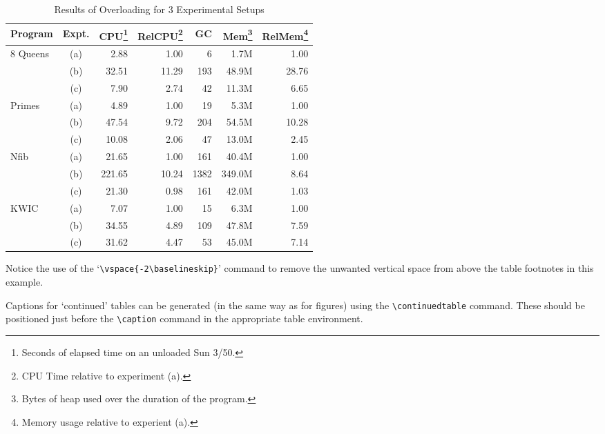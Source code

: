 \documentclass{jfp1}
\begin{document}
%
\begin{table}
  \caption{Results of Overloading for 3 Experimental Setups}
  \label{sample-table}
  \begin{minipage}{\textwidth}
    \begin{tabular}{lcrrrrr}
      \hline\hline
      Program& Expt.&
      CPU\footnote{Seconds of elapsed time on an unloaded Sun 3/50.}&
      RelCPU\footnote{CPU Time relative to experiment (a).}& GC&
      Mem\footnote{Bytes of heap used over the duration of the program.}&
      RelMem\footnote{Memory usage relative to experient (a).}\\
      \hline
      8 Queens& (a)&   2.88&  1.00&    6&   1.7M&  1.00\\
      &         (b)&  32.51& 11.29&  193&  48.9M& 28.76\\
      &         (c)&   7.90&  2.74&   42&  11.3M&  6.65\\
      \noalign{\vspace {.5cm}}
      Primes&   (a)&   4.89&  1.00&   19&   5.3M&  1.00\\
      &         (b)&  47.54&  9.72&  204&  54.5M& 10.28\\
      &         (c)&  10.08&  2.06&   47&  13.0M&  2.45\\
      \noalign{\vspace {.5cm}}
      Nfib&     (a)&  21.65&  1.00&  161&  40.4M&  1.00\\
      &         (b)& 221.65& 10.24& 1382& 349.0M&  8.64\\
      &         (c)&  21.30&  0.98&  161&  42.0M&  1.03\\
      \noalign{\vspace {.5cm}}
      KWIC&     (a)&   7.07&  1.00&   15&   6.3M&  1.00\\
      &         (b)&  34.55&  4.89&  109&  47.8M&  7.59\\
      &         (c)&  31.62&  4.47&   53&  45.0M&  7.14\\
      \hline\hline
    \end{tabular}
    \vspace{-2\baselineskip}
  \end{minipage}
\end{table}

Notice the use of the `\verb"\vspace{-2\baselineskip}"' command to remove the
unwanted vertical space from above the table footnotes in this example.

Captions for `continued' tables can be generated (in the same way as for figures)
using the \verb"\continuedtable" command. These should be positioned just before
the \verb"\caption" command in the appropriate table environment.
\end{document}
